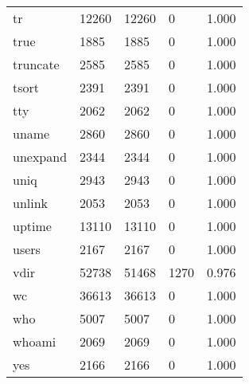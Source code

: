 \begin{longtable}{lp{3.0cm}p{3.0cm}p{3.0cm}p{3.0cm}}
tr        &                    12260 &        12260 &             0 &                    1.000 \\
true      &                     1885 &         1885 &             0 &                    1.000 \\
truncate  &                     2585 &         2585 &             0 &                    1.000 \\
tsort     &                     2391 &         2391 &             0 &                    1.000 \\
tty       &                     2062 &         2062 &             0 &                    1.000 \\
uname     &                     2860 &         2860 &             0 &                    1.000 \\
unexpand  &                     2344 &         2344 &             0 &                    1.000 \\
uniq      &                     2943 &         2943 &             0 &                    1.000 \\
unlink    &                     2053 &         2053 &             0 &                    1.000 \\
uptime    &                    13110 &        13110 &             0 &                    1.000 \\
users     &                     2167 &         2167 &             0 &                    1.000 \\
vdir      &                    52738 &        51468 &          1270 &                    0.976 \\
wc        &                    36613 &        36613 &             0 &                    1.000 \\
who       &                     5007 &         5007 &             0 &                    1.000 \\
whoami    &                     2069 &         2069 &             0 &                    1.000 \\
yes       &                     2166 &         2166 &             0 &                    1.000 \\
\end{longtable}
